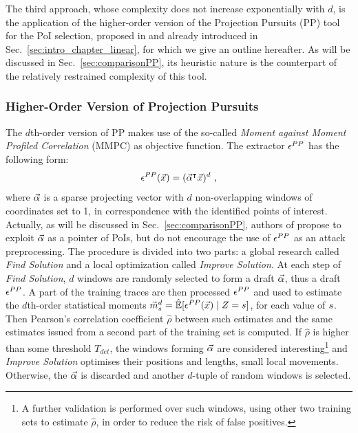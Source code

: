 The third approach, whose complexity does not increase exponentially with $d$, is the application of the higher-order version of the Projection Pursuits (PP) tool for the PoI selection, proposed in \cite{PP} and already introduced in Sec.~\ref{sec:intro_chapter_linear}, for which we give an outline hereafter. As will be discussed in Sec.~\ref{sec:comparisonPP}, its heuristic nature is the counterpart of the relatively restrained complexity of this tool. \\

%

\subsubsection{Higher-Order Version of Projection Pursuits}\label{sec:PP_description}
The $d$th-order version of PP makes use of the so-called \emph{Moment against Moment Profiled Correlation} (MMPC) as objective function. The extractor $\epsilon^{PP}$ has the following form:
\begin{equation} 
\epsilon^{PP}(\vec{x}) = (\vec{\alpha}^\intercal \vec{x})^d \mbox{ ,}
\end{equation}
where $\vec{\alpha}$ is a sparse projecting vector with $d$ non-overlapping windows of coordinates set to 1, in correspondence with the identified points of interest. Actually, as will be discussed in Sec.~\ref{sec:comparisonPP}, authors of \cite{PP} propose to exploit $\vec{\alpha}$ as a pointer of PoIs, but do not encourage the use of $\epsilon^{PP}$ as an attack preprocessing. The procedure is divided into two parts: a global research called {\em Find Solution} and a local optimization called {\em Improve Solution}. At each step of {\em Find Solution}, $d$ windows are randomly selected to form a draft $\vec{\alpha}$, thus a draft $\epsilon^{PP}$. A part of the training traces are then processed \via $\epsilon^{PP}$ and used to estimate the $d$th-order statistical moments $\mmm^d_\sensVarGenValue = \esperEst[\given{\extract^{PP}(\vLeakVec)}{\sensRandVar=\sensVarGenValue}]$,  for each value of $s$. Then Pearson's correlation coefficient $\hat{\rho}$ between such estimates and the same estimates issued from a second part of the training set is computed. If $\hat{\rho}$ is higher than some threshold $T_{det}$, the windows forming $\vec{\alpha}$ are considered interesting\footnote{A further validation is performed over such windows, using other two training sets to estimate $\hat{\rho}$, in order to reduce the risk of false positives.}\label{fn:4trainingSets} and \emph{Improve Solution} optimises their positions and lengths, \via small local movements. Otherwise, the $\vec{\alpha}$ is discarded and another $d$-tuple of random windows is selected.\\

